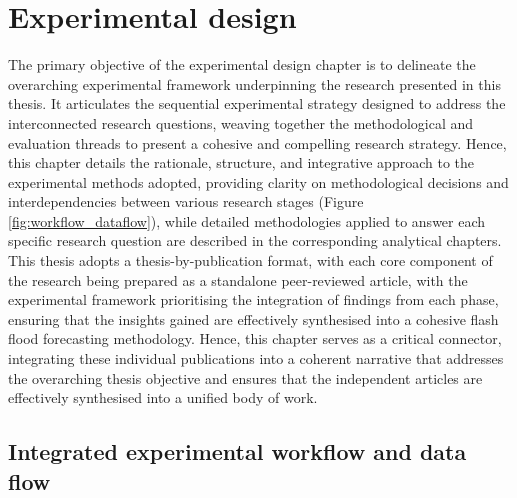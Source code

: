 \chapter{Experimental design}

The primary objective of the experimental design chapter is to delineate the overarching experimental framework underpinning the research presented in this thesis. It articulates the sequential experimental strategy designed to address the interconnected research questions, weaving together the methodological and evaluation threads to present a cohesive and compelling research strategy. Hence, this chapter details the rationale, structure, and integrative approach to the experimental methods adopted, providing clarity on methodological decisions and interdependencies between various research stages (Figure \ref{fig:workflow_dataflow}), while detailed methodologies applied to answer each specific research question are described in the corresponding analytical chapters. This thesis adopts a thesis-by-publication format, with each core component of the research being prepared as a standalone peer-reviewed article, with the experimental framework prioritising the integration of findings from each phase, ensuring that the insights gained are effectively synthesised into a cohesive flash flood forecasting methodology. Hence, this chapter serves as a critical connector, integrating these individual publications into a coherent narrative that addresses the overarching thesis objective and ensures that the independent articles are effectively synthesised into a unified body of work. 

\section{Integrated experimental workflow and data flow}


